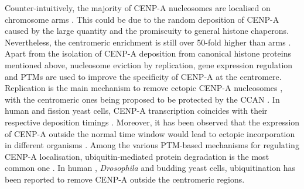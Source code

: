 Counter-intuitively, the majority of CENP-A nucleosomes are localised on chromosome arms \citep{Bodor2014}. This could be due to the random deposition of CENP-A caused by the large quantity and the promiscuity to general histone chaperons. Nevertheless, the centromeric enrichment is still over 50-fold higher than arms \citep{Bodor2014}. Apart from the isolation of CENP-A deposition from canonical histone proteins mentioned above, nucleosome eviction by replication, gene expression regulation and PTMs are used to improve the specificity of CENP-A at the centromere. Replication is the main mechanism to remove ectopic CENP-A nucleosomes \citep{Nechemia-Arbely2019, Wang2021PhosphorylationCycle}, with the centromeric ones being proposed to be protected by the CCAN \citep{Nechemia-Arbely2019}. In human and fission yeast cells, CENP-A transcription coincides with their respective deposition timings \citep{Shelby1997AssemblySites, Takahashi2000RequirementYeast, Aristizabal-Corrales2019CellFormation}. Moreover, it has been observed that the expression of CENP-A outside the normal time window would lead to ectopic incorporation in different organisms \citep{Aristizabal-Corrales2019CellFormation, Heun2006, Tomonaga2005CentromereAneuploidy, Au2008AlteredCerevisiae, Olszak2011, McGovern2012CentromereCancer, Athwal2015CENP-ACells, Shrestha2021, Moreno-Moreno2019TheCycle}. Among the various  PTM-based mechanisms for regulating CENP-A localisation, ubiquitin-mediated protein degradation is the most common one \citep{Stirpe2022}. In human \citep{Maehara2010CENP-AMitoses, Lomonte2001DegradationICP0}, \textit{Drosophila} \citep{Moreno-Moreno2019TheCycle, Bade2014TheManner} and budding yeast \citep{Ranjitkar2010AnDomain, Au2013AProteolysis, Mishra2015Pat1Ubiquitination, Zhou2021MolecularPsh1} cells, ubiquitination has been reported to remove CENP-A outside the centromeric regions. 


